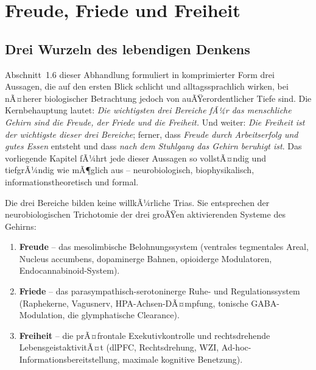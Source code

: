 ﻿\documentclass[12pt,a4paper]{report}
\theoremstyle{plain}
\theoremstyle{definition}
\theoremstyle{remark}
\begin{document}
	\chapter{Freude, Friede und Freiheit}

	\section{Drei Wurzeln des lebendigen Denkens}

	Abschnitt~1.6 dieser Abhandlung formuliert in komprimierter Form drei Aussagen,
	die auf den ersten Blick schlicht und alltagssprachlich wirken,
	bei nÃ¤herer biologischer Betrachtung jedoch von auÃŸerordentlicher Tiefe sind.
	Die Kernbehauptung lautet: \emph{Die wichtigsten drei Bereiche fÃ¼r das
	menschliche Gehirn sind die Freude, der Friede und die Freiheit.}
	Und weiter: \emph{Die Freiheit ist der wichtigste dieser drei Bereiche};
	ferner, dass \emph{Freude durch Arbeitserfolg und gutes Essen} entsteht
	und dass \emph{nach dem Stuhlgang das Gehirn beruhigt ist}.
	Das vorliegende Kapitel fÃ¼hrt jede dieser Aussagen so vollstÃ¤ndig und
	tiefgrÃ¼ndig wie mÃ¶glich aus -- neurobiologisch, biophysikalisch,
	informationstheoretisch und formal.

	Die drei Bereiche bilden keine willkÃ¼rliche Trias.
	Sie entsprechen der neurobiologischen Trichotomie der drei groÃŸen
	aktivierenden Systeme des Gehirns:
	\begin{enumerate}[label=(\roman*), leftmargin=1.8cm]
		\item \textbf{Freude} -- das mesolimbische Belohnungssystem
		(ventrales tegmentales Areal, Nucleus accumbens, dopaminerge Bahnen,
		opioiderge Modulatoren, Endocanna\-binoid-System).
		\item \textbf{Friede} -- das parasympathisch-serotoninerge Ruhe-
		und Regulationssystem (Raphekerne, Vagusnerv, HPA-Achsen-DÃ¤mpfung,
		tonische GABA-Modulation, die glymphatische Clearance).
		\item \textbf{Freiheit} -- die prÃ¤frontale Exekutivkontrolle und
		rechtsdrehende LebensgeistaktivitÃ¤t (dlPFC, Rechtsdrehung, WZI,
		Ad-hoc-Informationsbereitstellung, maximale kognitive Benetzung).
	\end{enumerate}
\end{document}
